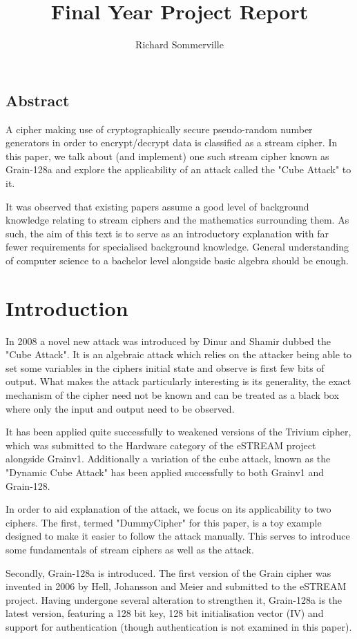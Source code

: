 \documentclass{report}
\title{Final Year Project Report}
\author{Richard Sommerville}
\date{}
\let\Oldsection\section
\renewcommand{\section}{\FloatBarrier\Oldsection}
\begin{document}
\maketitle
\tableofcontents
\section{Abstract}
A cipher making use of cryptographically secure pseudo-random number generators in order to encrypt/decrypt data is classified as a stream cipher. In this paper, we talk about (and implement) one such stream cipher known as Grain-128a and explore the applicability of an attack called the "Cube Attack" to it.

It was observed that existing papers assume a good level of background knowledge relating to stream ciphers and the mathematics surrounding them. As such, the aim of this text is to serve as an introductory explanation with far fewer requirements for specialised background knowledge. General understanding of computer science to a bachelor level alongside basic algebra should be enough.
\chapter{Introduction}
In 2008 a novel new attack was introduced by Dinur and Shamir\cite{DinurShamir2009} dubbed the "Cube Attack". It is an algebraic attack which relies on the attacker being able to set some variables in the ciphers initial state and observe is first few bits of output. What makes the attack particularly interesting is its generality, the exact mechanism of the cipher need not be known and can be treated as a black box where only the input and output need to be observed.

It has been applied quite successfully to weakened versions of the Trivium cipher, which was submitted to the Hardware category of the eSTREAM project alongside Grainv1\cite{eStreamPort}. Additionally a variation of the cube attack, known as the "Dynamic Cube Attack" has been applied successfully to both Grainv1 and Grain-128.

In order to aid explanation of the attack, we focus on its applicability to two ciphers. The first, termed "DummyCipher" for this paper, is a toy example designed to make it easier to follow the attack manually. This serves to introduce some fundamentals of stream ciphers as well as the attack.

Secondly, Grain-128a is introduced. The first version of the Grain cipher was invented in 2006 by Hell, Johansson and Meier \cite{Grain128aSpec} and submitted to the eSTREAM project. Having undergone several alteration to strengthen it, Grain-128a is the latest version, featuring a 128 bit key, 128 bit initialisation vector (IV) and support for authentication (though authentication is not examined in this paper).
\end{document}

